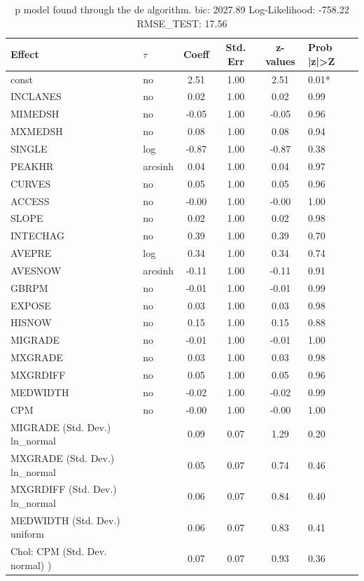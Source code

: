\begin{table}
	\caption{p model found through the de algorithm. bic: 2027.89 Log-Likelihood: -758.22 RMSE_TEST: 17.56}
	\begin{center}
		\begin{tabular}{|l|l|c|c|c|l|}
			\hline
			Effect & $\tau$ & Coeff & Std. Err & z-values & Prob |z|>Z \\
			\hline
			const & no & 2.51 & 1.00 & 2.51 & 0.01* \\
			\hline
			INCLANES & no & 0.02 & 1.00 & 0.02 & 0.99 \\
			\hline
			MIMEDSH & no & -0.05 & 1.00 & -0.05 & 0.96 \\
			\hline
			MXMEDSH & no & 0.08 & 1.00 & 0.08 & 0.94 \\
			\hline
			SINGLE & log & -0.87 & 1.00 & -0.87 & 0.38 \\
			\hline
			PEAKHR & arcsinh & 0.04 & 1.00 & 0.04 & 0.97 \\
			\hline
			CURVES & no & 0.05 & 1.00 & 0.05 & 0.96 \\
			\hline
			ACCESS & no & -0.00 & 1.00 & -0.00 & 1.00 \\
			\hline
			SLOPE & no & 0.02 & 1.00 & 0.02 & 0.98 \\
			\hline
			INTECHAG & no & 0.39 & 1.00 & 0.39 & 0.70 \\
			\hline
			AVEPRE & log & 0.34 & 1.00 & 0.34 & 0.74 \\
			\hline
			AVESNOW & arcsinh & -0.11 & 1.00 & -0.11 & 0.91 \\
			\hline
			GBRPM & no & -0.01 & 1.00 & -0.01 & 0.99 \\
			\hline
			EXPOSE & no & 0.03 & 1.00 & 0.03 & 0.98 \\
			\hline
			HISNOW & no & 0.15 & 1.00 & 0.15 & 0.88 \\
			\hline
			MIGRADE & no & -0.01 & 1.00 & -0.01 & 1.00 \\
			\hline
			MXGRADE & no & 0.03 & 1.00 & 0.03 & 0.98 \\
			\hline
			MXGRDIFF & no & 0.05 & 1.00 & 0.05 & 0.96 \\
			\hline
			MEDWIDTH & no & -0.02 & 1.00 & -0.02 & 0.99 \\
			\hline
			CPM & no & -0.00 & 1.00 & -0.00 & 1.00 \\
			\hline
			MIGRADE (Std. Dev.) ln_normal &  & 0.09 & 0.07 & 1.29 & 0.20 \\
			\hline
			MXGRADE (Std. Dev.) ln_normal &  & 0.05 & 0.07 & 0.74 & 0.46 \\
			\hline
			MXGRDIFF (Std. Dev.) ln_normal &  & 0.06 & 0.07 & 0.84 & 0.40 \\
			\hline
			MEDWIDTH (Std. Dev.) uniform &  & 0.06 & 0.07 & 0.83 & 0.41 \\
			\hline
			 Chol: CPM (Std. Dev. normal) ) &  & 0.07 & 0.07 & 0.93 & 0.36 \\
			\hline
		\end{tabular}
	\end{center}
\end{table}